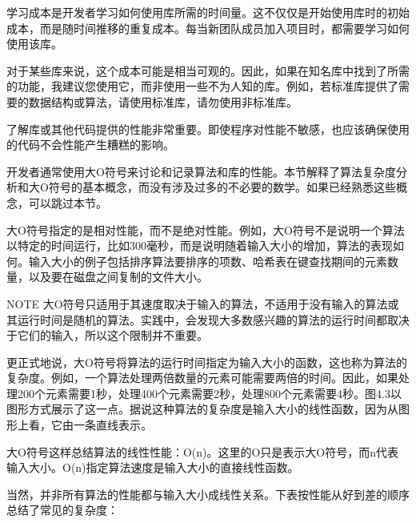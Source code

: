 
学习成本是开发者学习如何使用库所需的时间量。这不仅仅是开始使用库时的初始成本，而是随时间推移的重复成本。每当新团队成员加入项目时，都需要学习如何使用该库。

对于某些库来说，这个成本可能是相当可观的。因此，如果在知名库中找到了所需的功能，我建议您使用它，而非使用一些不为人知的库。例如，若标准库提供了需要的数据结构或算法，请使用标准库，请勿使用非标准库。


了解库或其他代码提供的性能非常重要。即使程序对性能不敏感，也应该确保使用的代码不会性能产生糟糕的影响。


开发者通常使用大O符号来讨论和记录算法和库的性能。本节解释了算法复杂度分析和大O符号的基本概念，而没有涉及过多的不必要的数学。如果已经熟悉这些概念，可以跳过本节。

大O符号指定的是相对性能，而不是绝对性能。例如，大O符号不是说明一个算法以特定的时间运行，比如300毫秒，而是说明随着输入大小的增加，算法的表现如何。输入大小的例子包括排序算法要排序的项数、哈希表在键查找期间的元素数量，以及要在磁盘之间复制的文件大小。

\begin{myNotic}{NOTE}
大O符号只适用于其速度取决于输入的算法，不适用于没有输入的算法或其运行时间是随机的算法。实践中，会发现大多数感兴趣的算法的运行时间都取决于它们的输入，所以这个限制并不重要。
\end{myNotic}

更正式地说，大O符号将算法的运行时间指定为输入大小的函数，这也称为算法的复杂度。例如，一个算法处理两倍数量的元素可能需要两倍的时间。因此，如果处理200个元素需要1秒，处理400个元素需要2秒，处理800个元素需要4秒。图4.3以图形方式展示了这一点。据说这种算法的复杂度是输入大小的线性函数，因为从图形上看，它由一条直线表示。


大O符号这样总结算法的线性性能：O(n)。这里的O只是表示大O符号，而n代表输入大小。O(n)指定算法速度是输入大小的直接线性函数。

当然，并非所有算法的性能都与输入大小成线性关系。下表按性能从好到差的顺序总结了常见的复杂度：

